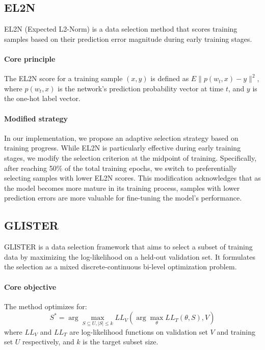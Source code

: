 \subsection{EL2N}
EL2N (Expected L2-Norm) is a data selection method that scores training samples based on their prediction error magnitude during early training stages.

\paragraph{Core principle} 
The EL2N score for a training sample $(x,y)$ is defined as $E\|p(w_t,x)-y\|^2$, where $p(w_t,x)$ is the network's prediction probability vector at time $t$, and $y$ is the one-hot label vector.

\paragraph{Modified strategy}
In our implementation, we propose an adaptive selection strategy based on training progress. While EL2N is particularly effective during early training stages, we modify the selection criterion at the midpoint of training. Specifically, after reaching 50\% of the total training epochs, we switch to preferentially selecting samples with lower EL2N scores. This modification acknowledges that as the model becomes more mature in its training process, samples with lower prediction errors are more valuable for fine-tuning the model's performance.

\subsection{GLISTER}
GLISTER is a data selection framework that aims to select a subset of training data by maximizing the log-likelihood on a held-out validation set. It formulates the selection as a mixed discrete-continuous bi-level optimization problem.

\paragraph{Core objective} 
The method optimizes for:
\begin{equation}
S^* = \arg\max_{S\subseteq U,|S|\leq k} LL_V(\arg\max_{\theta} LL_T(\theta,S), V)
\end{equation}
where $LL_V$ and $LL_T$ are log-likelihood functions on validation set $V$ and training set $U$ respectively, and $k$ is the target subset size.

